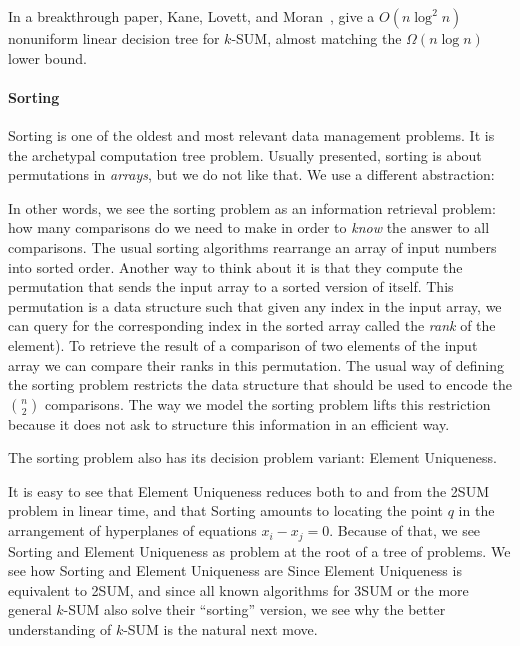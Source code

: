 In a breakthrough paper, Kane, Lovett, and Moran~\cite{KLM18}, give a
\(O(n \log^2 n)\) nonuniform linear decision tree for \(k\)-SUM, almost
matching the \(\Omega(n \log n)\) lower bound.


\paragraph{Sorting}
Sorting is one of the oldest and most relevant data management problems.
It is the archetypal computation tree problem.
%
Usually presented, sorting is about permutations in \emph{arrays}, but we do
not like that. We use a different abstraction:
%


In other words, we see the sorting problem as an information retrieval problem:
how many comparisons do we need to make in order to \emph{know} the answer to
all comparisons.
%
The usual sorting algorithms rearrange an array of input numbers into sorted
order. Another way to think about it is that they compute the permutation that
sends the input array to a sorted version of itself. This permutation is a data
structure such that given any index in the input array, we can query for the
corresponding index in the sorted array called the \emph{rank} of the element).
To retrieve the result of a comparison of two elements of the input array we can
compare their ranks in this permutation.
The usual way of defining the sorting problem restricts the data structure that
should be used to encode the \(n \choose 2\) comparisons.
The way we model the sorting problem lifts this restriction because it does not
ask to structure this information in an efficient way.

The sorting problem also has its decision problem variant: Element Uniqueness.
%


It is easy to see that Element Uniqueness reduces both to and from the 2SUM
problem in linear time, and that Sorting amounts to locating the point \(q\) in
the arrangement of hyperplanes of equations \(x_i - x_j = 0\).
%
Because of that, we see Sorting and Element Uniqueness as problem at the root
of a tree of problems.
We see how Sorting and Element Uniqueness are 
Since Element Uniqueness is equivalent to 2SUM, and since all known algorithms
for 3SUM or the more general \(k\)-SUM also solve their ``sorting'' version, we
see why the better understanding of \(k\)-SUM is the natural next move.

